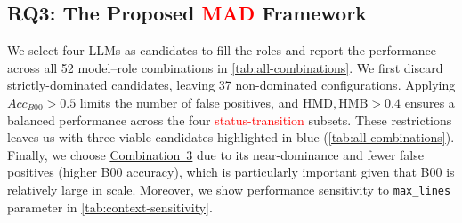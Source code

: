 \documentclass[authoryear,final,5p,times,twocolumn]{elsarticle}
\theoremstyle{plain}
\begin{document}
\subsection{RQ3: The Proposed \textcolor{red}{MAD} Framework }
\label{sec:RQ3}
We select four LLMs as candidates to fill the roles and report the performance across all 52 model–role combinations in \autoref{tab:all-combinations}. 
We first discard strictly-dominated candidates, leaving 37 non-dominated configurations. Applying $Acc_{B00} > 0.5$ limits the number of false positives, and $\text{HMD}, \text{HMB} > 0.4$ ensures a balanced performance across the four \textcolor{red}{status-transition} subsets. These restrictions leaves us with three viable candidates highlighted in blue (\autoref{tab:all-combinations}). Finally, we choose \hyperlink{case3}{Combination~3} due to its near-dominance and fewer false positives (higher B00 accuracy), which is particularly important given that B00 is relatively large in scale. Moreover, we show performance sensitivity to \texttt{max\_lines} parameter in \autoref{tab:context-sensitivity}. 
\end{document}
